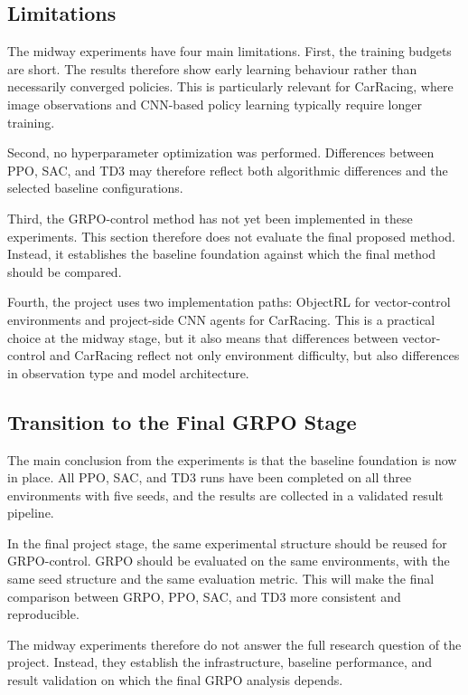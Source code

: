 \subsection{Limitations}
\label{sec:experiment-limitations}

The midway experiments have four main limitations. First, the training budgets are short. The results therefore show early learning behaviour rather than necessarily converged policies. This is particularly relevant for CarRacing, where image observations and CNN-based policy learning typically require longer training.

Second, no hyperparameter optimization was performed. Differences between PPO, SAC, and TD3 may therefore reflect both algorithmic differences and the selected baseline configurations.

Third, the GRPO-control method has not yet been implemented in these experiments. This section therefore does not evaluate the final proposed method. Instead, it establishes the baseline foundation against which the final method should be compared.

Fourth, the project uses two implementation paths: ObjectRL for vector-control environments and project-side CNN agents for CarRacing. This is a practical choice at the midway stage, but it also means that differences between vector-control and CarRacing reflect not only environment difficulty, but also differences in observation type and model architecture.

\subsection{Transition to the Final GRPO Stage}
\label{sec:transition-final-grpo}

The main conclusion from the experiments is that the baseline foundation is now in place. All PPO, SAC, and TD3 runs have been completed on all three environments with five seeds, and the results are collected in a validated result pipeline.

In the final project stage, the same experimental structure should be reused for GRPO-control. GRPO should be evaluated on the same environments, with the same seed structure and the same evaluation metric. This will make the final comparison between GRPO, PPO, SAC, and TD3 more consistent and reproducible.

The midway experiments therefore do not answer the full research question of the project. Instead, they establish the infrastructure, baseline performance, and result validation on which the final GRPO analysis depends.
